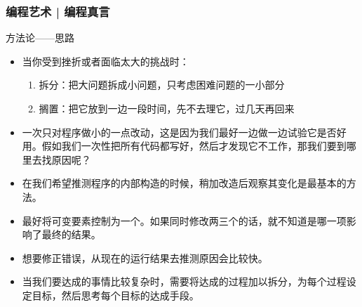 \begin{frame}
  \frametitle{编程艺术 | 编程真言}
  \begin{block}{方法论——思路}
    \begin{itemize}
      \item 当你受到挫折或者面临太大的挑战时：
        \begin{enumerate}
          \item \alert{拆分}：把大问题拆成小问题，只考虑困难问题的一小部分
          \item \alert{搁置}：把它放到一边一段时间，先不去理它，过几天再回来
        \end{enumerate}
    \item \alert{一次只对程序做小的一点改动}，这是因为我们最好一边做一边试验它是否好用。假如我们一次性把所有代码都写好，然后才发现它不工作，那我们要到哪里去找原因呢？
    \item 在我们希望推测程序的内部构造的时候，\alert{稍加改造}后观察其变化是最基本的方法。
    \item 最好将\alert{可变要素}控制为一个。如果同时修改两三个的话，就不知道是哪一项影响了最终的结果。
    \item 想要修正错误，从现在的运行\alert{结果去推测原因}会比较快。
      \item 当我们要达成的事情比较复杂时，需要将达成的过程加以拆分，为每个过程设定目标，然后思考每个目标的达成手段。

\end{itemize}
\end{block}
\end{frame}
